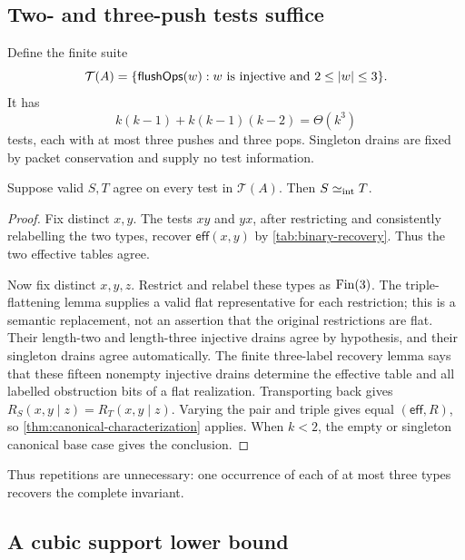 \subsection{Two- and three-push tests suffice}

Define the finite suite
\begin{equation}
 \mathcal T(A)=
 \{\mathsf{flushOps}(w): w\text{ is injective and }2\le |w|\le3\}.
 \label{eq:three-push-suite}
\end{equation}
It has
\begin{equation}
 k(k-1)+k(k-1)(k-2)=\Theta(k^3)
 \label{eq:three-push-suite-size}
\end{equation}
tests, each with at most three pushes and three pops.  Singleton drains are
fixed by packet conservation and supply no test information.

\begin{theorem}
\label{thm:three-push-sufficiency}
Suppose valid \(S,T\) agree on every test in \(\mathcal T(A)\).  Then
\(S\mathrel{\simeq_{\mathrm{int}}} T\).
\end{theorem}

\begin{proof}
Fix distinct \(x,y\).  The tests \(xy\) and \(yx\), after restricting and
consistently relabelling the two types, recover
\(\mathsf{eff}(x,y)\) by \autoref{tab:binary-recovery}.  Thus the two effective
tables agree.

Now fix distinct \(x,y,z\).  Restrict and relabel these types as \(\operatorname{Fin}(3)\).
The triple-flattening lemma supplies a valid flat representative for each
restriction; this is a semantic replacement, not an assertion that the
original restrictions are flat.  Their length-two and length-three injective
drains agree by hypothesis, and their singleton drains agree automatically.
The finite three-label recovery lemma says that these fifteen nonempty
injective drains determine the effective table and all labelled obstruction
bits of a flat realization.  Transporting back gives
\(R_S(x,y\mid z)=R_T(x,y\mid z)\).  Varying the pair and triple gives equal
\((\mathsf{eff},R)\), so \autoref{thm:canonical-characterization} applies.  When
\(k<2\), the empty or singleton canonical base case gives the conclusion.
\end{proof}

Thus repetitions are unnecessary: one occurrence of each of at most three
types recovers the complete invariant.

\subsection{A cubic support lower bound}

